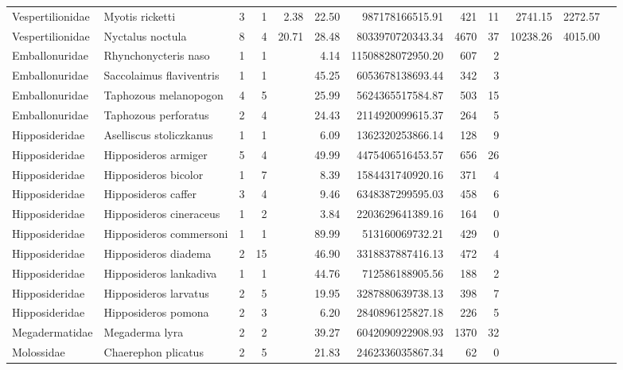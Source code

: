 \begin{landscape}
\begin{longtable}{@{}llrrrrrrrrrr@{}}
  Vespertilionidae & Myotis ricketti &   3 &   1 & 2.38 & 22.50 & 987178166515.91 & 421 &  11 & 2741.15 & 2272.57 & \cite{lu2013phylogeography} \\ 
  Vespertilionidae & Nyctalus noctula &   8 &   4 & 20.71 & 28.48 & 8033970720343.34 & 4670 &  37 & 10238.26 & 4015.00 & \cite{burns2014correlates} \\ 
  Emballonuridae & Rhynchonycteris naso &   1 &   1 &  & 4.14 & 11508828072950.20 & 607 &   2 &  &  &  \\ 
  Emballonuridae & Saccolaimus flaviventris &   1 &   1 &  & 45.25 & 6053678138693.44 & 342 &   3 &  &  &  \\ 
  Emballonuridae & Taphozous melanopogon &   4 &   5 &  & 25.99 & 5624365517584.87 & 503 &  15 &  &  &  \\ 
  Emballonuridae & Taphozous perforatus &   2 &   4 &  & 24.43 & 2114920099615.37 & 264 &   5 &  &  &  \\ 
  Hipposideridae & Aselliscus stoliczkanus &   1 &   1 &  & 6.09 & 1362320253866.14 & 128 &   9 &  &  &  \\ 
  Hipposideridae & Hipposideros armiger &   5 &   4 &  & 49.99 & 4475406516453.57 & 656 &  26 &  &  &  \\ 
  Hipposideridae & Hipposideros bicolor &   1 &   7 &  & 8.39 & 1584431740920.16 & 371 &   4 &  &  &  \\ 
  Hipposideridae & Hipposideros caffer &   3 &   4 &  & 9.46 & 6348387299595.03 & 458 &   6 &  &  &  \\ 
  Hipposideridae & Hipposideros cineraceus &   1 &   2 &  & 3.84 & 2203629641389.16 & 164 &   0 &  &  &  \\ 
  Hipposideridae & Hipposideros commersoni &   1 &   1 &  & 89.99 & 513160069732.21 & 429 &   0 &  &  &  \\ 
  Hipposideridae & Hipposideros diadema &   2 &  15 &  & 46.90 & 3318837887416.13 & 472 &   4 &  &  &  \\ 
  Hipposideridae & Hipposideros lankadiva &   1 &   1 &  & 44.76 & 712586188905.56 & 188 &   2 &  &  &  \\ 
  Hipposideridae & Hipposideros larvatus &   2 &   5 &  & 19.95 & 3287880639738.13 & 398 &   7 &  &  &  \\ 
  Hipposideridae & Hipposideros pomona &   2 &   3 &  & 6.20 & 2840896125827.18 & 226 &   5 &  &  &  \\ 
  Megadermatidae & Megaderma lyra &   2 &   2 &  & 39.27 & 6042090922908.93 & 1370 &  32 &  &  &  \\ 
  Molossidae & Chaerephon plicatus &   2 &   5 &  & 21.83 & 2462336035867.34 &  62 &   0 &  &  &  \\ 

\end{longtable}
\end{landscape}
